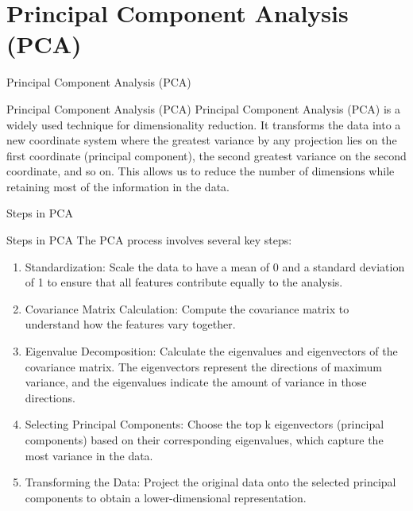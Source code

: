 \documentclass[hyperref={pdfpagelabels=false},aspectratio=169]{beamer}
\begin{document}
\section[PCA]{Principal Component Analysis (PCA)}
\label{sec:org06bf07c}
\begin{frame}[label={sec:orgea98a4b}]{Principal Component Analysis (PCA)}
\begin{block}{Principal Component Analysis (PCA)}
\pause
\alert{Principal Component Analysis (PCA)} is a widely used technique for dimensionality reduction. It transforms the data into a new coordinate system where the greatest variance by any projection lies on the first coordinate (principal component), the second greatest variance on the second coordinate, and so on. This allows us to reduce the number of dimensions while retaining most of the information in the data.
\end{block}
\end{frame}
\begin{frame}[label={sec:orgc2e68b2}]{Steps in PCA}
\begin{block}{Steps in PCA}
\pause
The PCA process involves several key steps:
\begin{enumerate}[<+->]
\item \alert{Standardization}: Scale the data to have a mean of 0 and a standard deviation of 1 to ensure that all features contribute equally to the analysis.
\item \alert{Covariance Matrix Calculation}: Compute the covariance matrix to understand how the features vary together.
\item \alert{Eigenvalue Decomposition}: Calculate the eigenvalues and eigenvectors of the covariance matrix. The eigenvectors represent the directions of maximum variance, and the eigenvalues indicate the amount of variance in those directions.
\item \alert{Selecting Principal Components}: Choose the top k eigenvectors (principal components) based on their corresponding eigenvalues, which capture the most variance in the data.
\item \alert{Transforming the Data}: Project the original data onto the selected principal components to obtain a lower-dimensional representation.
\end{enumerate}
\end{block}
\end{frame}
\end{document}
